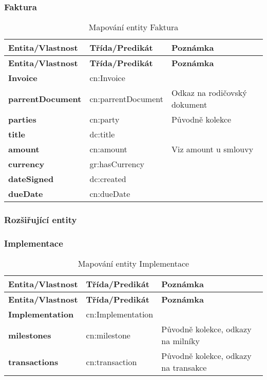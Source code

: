 \subsubsection*{Faktura}

\begin{center}
\begin{longtable}{lp{30mm}p{65mm}}
\label{grid_mlmmh} \\
\multicolumn{1}{l}{\textbf{Entita/Vlastnost}} & 
\multicolumn{1}{l}{\textbf{Třída/Predikát}} & 
\multicolumn{1}{l}{\textbf{Poznámka}} \\ \hline 
\endfirsthead
\multicolumn{1}{l}{\textbf{Entita/Vlastnost}} & 
\multicolumn{1}{l}{\textbf{Třída/Predikát}} & 
\multicolumn{1}{l}{\textbf{Poznámka}} \\ \hline 
\hline
\endhead
\endfoot
\caption{Mapování entity Faktura}
\endlastfoot
\textbf{Invoice} & cn:Invoice \\
\textbf{parrentDocument} & cn:parrentDocument & Odkaz na rodičovský dokument \\
\textbf{parties} & cn:party & Původně kolekce \\
\textbf{title} & dc:title \\
\textbf{amount} & cn:amount & Viz amount u smlouvy \\
\textbf{currency} & gr:hasCurrency \\
\textbf{dateSigned} & dc:created \\
\textbf{dueDate} & cn:dueDate \\
\end{longtable}
\end{center}

\subsubsection*{Rozšiřující entity}

\subsubsection*{Implementace}

\begin{center}
\begin{longtable}{lp{30mm}p{65mm}}
\label{grid_mlmmh} \\
\multicolumn{1}{l}{\textbf{Entita/Vlastnost}} & 
\multicolumn{1}{l}{\textbf{Třída/Predikát}} & 
\multicolumn{1}{l}{\textbf{Poznámka}} \\ \hline 
\endfirsthead
\multicolumn{1}{l}{\textbf{Entita/Vlastnost}} & 
\multicolumn{1}{l}{\textbf{Třída/Predikát}} & 
\multicolumn{1}{l}{\textbf{Poznámka}} \\ \hline 
\hline
\endhead
\endfoot
\caption{Mapování entity Implementace}
\endlastfoot
\textbf{Implementation} & cn:Implementation & \\
\textbf{milestones} & cn:milestone & Původně kolekce, odkazy na milníky\\
\textbf{transactions} & cn:transaction & Původně kolekce, odkazy na transakce\\
\end{longtable}
\end{center}

